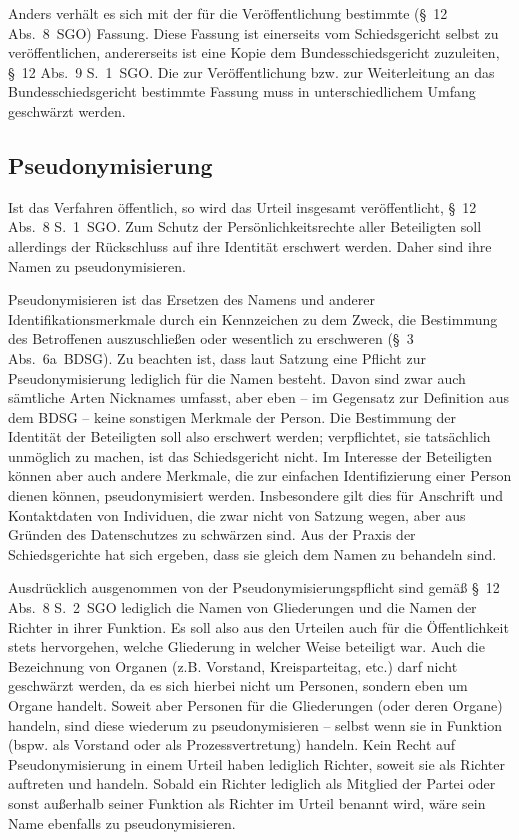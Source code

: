 Anders verhält es sich mit der für die Veröffentlichung bestimmte (\S~12 Abs.~8~SGO) Fassung.
Diese Fassung ist einerseits vom Schiedsgericht selbst zu veröffentlichen, andererseits ist eine Kopie dem Bundesschiedsgericht zuzuleiten, \S~12 Abs.~9 S.~1~SGO.
Die zur Veröffentlichung bzw. zur Weiterleitung an das Bundesschiedsgericht bestimmte Fassung muss in unterschiedlichem Umfang geschwärzt werden.

\subsection{Pseudonymisierung}
\label{Dokumentation:Urteile:Pseudonymisierung}
Ist das Verfahren öffentlich, so wird das Urteil insgesamt veröffentlicht, \S~12 Abs.~8 S.~1~SGO.
Zum Schutz der Persönlichkeitsrechte aller Beteiligten soll allerdings der Rückschluss auf ihre Identität erschwert werden.
Daher sind ihre Namen zu pseudonymisieren.

Pseudonymisieren ist das Ersetzen des Namens und anderer Identifikationsmerkmale durch ein Kennzeichen zu dem Zweck, die Bestimmung des Betroffenen auszuschließen oder wesentlich zu erschweren (\S~3 Abs.~6a~BDSG).
Zu beachten ist, dass laut Satzung eine Pflicht zur Pseudonymisierung lediglich für die Namen besteht.
Davon sind zwar auch sämtliche Arten Nicknames umfasst, aber eben -- im Gegensatz zur Definition aus dem BDSG -- keine sonstigen Merkmale der Person.
Die Bestimmung der Identität der Beteiligten soll also erschwert werden; verpflichtet, sie tatsächlich unmöglich zu machen, ist das Schiedsgericht nicht.
Im Interesse der Beteiligten können aber auch andere Merkmale, die zur einfachen Identifizierung einer Person dienen können, pseudonymisiert werden.
Insbesondere gilt dies für Anschrift und Kontaktdaten von Individuen, die zwar nicht von Satzung wegen, aber aus Gründen des Datenschutzes zu schwärzen sind.
Aus der Praxis der Schiedsgerichte hat sich ergeben, dass sie gleich dem Namen zu behandeln sind. 

Ausdrücklich ausgenommen von der Pseudonymisierungspflicht sind gemäß \S~12 Abs.~8 S.~2~SGO lediglich die Namen von Gliederungen und die Namen der Richter in ihrer Funktion.
Es soll also aus den Urteilen auch für die Öffentlichkeit stets hervorgehen, welche Gliederung in welcher Weise beteiligt war.
Auch die Bezeichnung von Organen (z.B. Vorstand, Kreisparteitag, etc.) darf nicht geschwärzt werden, da es sich hierbei nicht um Personen, sondern eben um Organe handelt.
Soweit aber Personen für die Gliederungen (oder deren Organe) handeln, sind diese wiederum zu pseudonymisieren -- selbst wenn sie in Funktion (bspw. als Vorstand oder als Prozessvertretung) handeln.
Kein Recht auf Pseudonymisierung in einem Urteil haben lediglich Richter, soweit sie als Richter auftreten und handeln.
Sobald ein Richter lediglich als Mitglied der Partei oder sonst außerhalb seiner Funktion als Richter im Urteil benannt wird, wäre sein Name ebenfalls zu pseudonymisieren.

